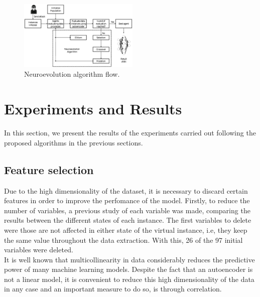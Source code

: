 \documentclass{iosart2c}
\begin{document}
\begin{figure}[h!]
\includegraphics[width=0.51\textwidth]{figs/neuroevolution/diag_neuroevolution.eps}
\vspace{-0.5cm}
\caption{Neuroevolution algorithm flow.}
\label{fig:diagneuroevolution}
\end{figure}




\section{Experiments and Results}
In this section, we present the results of the experiments carried out following the proposed algorithms in the previous sections. 



\subsection{Feature selection}

Due to the high dimensionality of the dataset, it is necessary to discard certain features in order to improve the perfomance of the model. Firstly, to reduce the number of variables, a previous study of each variable was made, comparing the results between the different states of each instance. The first variables to delete were those are not affected in either state of the virtual instance, i.e, they keep the same value throughout the data extraction. With this, 26 of the 97 initial variables were deleted. \\

It is well known that multicollinearity in data considerably reduces the predictive power of many machine learning models. Despite the fact that an autoencoder is not a linear model, it is convenient to reduce this high dimensionality of the data in any case and an important measure to do so, is through correlation. \\
\end{document}
